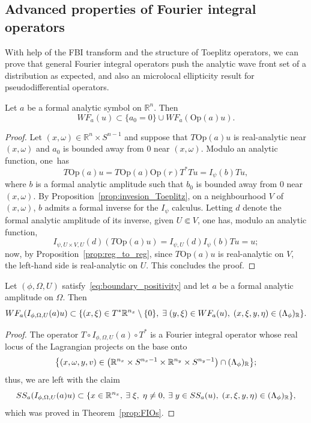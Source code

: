 \documentclass[AHL,Unicode,longabstracts,published]{cedram}
\newcommand{\Opp}{\mathrm{Op}}
\newcommand\1{\mathds{1}}
\newcommand{\R}{\mathbb{R}}
\let\oldexists\exists
\renewcommand*{\exists}{\mathrel{\oldexists}}
\let\originalleft\left
\let\originalright\right
\renewcommand{\left}{\mathopen{}\mathclose\bgroup\originalleft}
\renewcommand{\right}{\aftergroup\egroup\originalright}
\begin{document}
\subsection{Advanced properties of Fourier {integral operators}}\label{sec:advanced-properties}

With help of the FBI transform and the structure of Toeplitz operators, we can prove that general Fourier {integral operators} push the analytic wave front set of a distribution as expected, and also an microlocal ellipticity result for pseudodifferential operators.

\begin{prop}\label{prop:WF_Pu}
Let $a$ be a formal analytic symbol on $\R^n$. Then
\[
WF_a(u)\subset \{a_0=0\}\cup WF_a(\Opp(a)u).
\]
\end{prop}
\begin{proof}
Let $(x,\omega)\in \R^n\times S^{n-1}$ and suppose that $T\Opp(a)u$ is real-analytic near $(x,\omega)$ and $a_0$ is bounded away from $0$ near $(x,\omega)$. Modulo an analytic function, one~has
\[
T\Opp(a)u=T\Opp(a)\Opp(r)T^*Tu=I_{\psi}(b)Tu,
\]
where $b$ is a formal analytic amplitude such that $b_0$ is bounded away from $0$ near $(x,\omega)$. By Proposition~\ref{prop:invesion_Toeplitz}, on a neighbourhood $V$ of $(x,\omega)$, $b$ admits a formal inverse for the $I_{\psi}$ calculus. Letting $d$ denote the formal analytic amplitude of its inverse, given $U\Subset V$, one has, modulo an analytic function,
\[
I_{\psi,U\times V,U}(d)(T\Opp(a)u) = I_{\psi,U}(d)I_{\psi}(b)Tu=u;
\]
now, by Proposition~\ref{prop:reg_to_reg}, since $T\Opp(a)u$ is real-analytic on $V$, the left-hand side is real-analytic on $U$. This concludes the proof.
\end{proof}


\begin{prop}\label{prop:FIO-WF}
Let $(\phi,\Omega,U)$ satisfy~\eqref{eq:boundary_positivity} and let $a$ be a formal analytic amplitude on $\Omega$. Then
\[
WF_a(I_{\phi,\Omega,U}(a)u)\subset \left\{(x,\xi)\in T^*\R^{n_x}\setminus \{0\},\;
\exists (y,\xi)\in WF_a(u), \; (x,\xi,y,\eta)\in (\Lambda_{\phi})_{\R}\right\}.
\]
\end{prop}
\begin{proof}
The operator $T\circ I_{\phi,\Omega,U}(a)\circ T^*$ is a Fourier integral operator whose real locus of the Lagrangian projects on the base onto
\[
\left\{(x,\omega,y,v)\in \left(\R^{n_x}\times S^{n_x-1}\times \R^{n_y}\times S^{n_y-1}\right)\cap (\Lambda_{\phi})_{\R}\right\};
\]
thus, we are left with the claim
\[
SS_a(I_{\phi,\Omega,U}(a)u)\subset \left\{x\in \R^{n_x},\: \exists
\xi,\;\eta\neq 0, \:\exists y\in SS_a(u), \;(x,\xi,y,\eta)\in (\Lambda_{\phi})_{\R}\right\},
\]
which was proved in Theorem~\ref{prop:FIOs}.
\end{proof}
\end{document}
